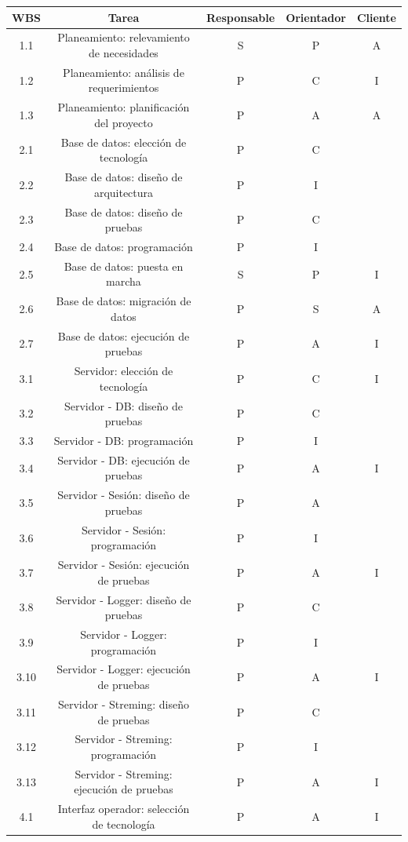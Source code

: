 \documentclass[
12pt,
spanish,
singlespacing,
parskip,
headsepline,]{article}
\begin{document}
\begin{table}[H]
	\centering
	\begin{tabular}{ccccc}
		WBS & Tarea & Responsable & Orientador & Cliente \\ \hline
		1.1 & Planeamiento: relevamiento de necesidades & S & P & A \\
		1.2 & Planeamiento: análisis de requerimientos & P & C &  I \\
		1.3 & Planeamiento: planificación del proyecto & P & A & A \\ \hline
		2.1 & Base de datos: elección de tecnología & P & C &   \\
		2.2 & Base de datos: diseño de arquitectura & P & I &   \\
		2.3 & Base de datos: diseño de pruebas & P & C &   \\
		2.4 & Base de datos: programación & P & I &   \\
		2.5 & Base de datos: puesta en marcha & S & P & I \\
		2.6 & Base de datos: migración de datos & P & S & A \\
		2.7 & Base de datos: ejecución de pruebas & P & A & I \\ \hline
		3.1 & Servidor: elección de tecnología & P & C & I \\
		3.2 & Servidor - DB: diseño de pruebas & P & C &   \\
		3.3 & Servidor - DB: programación  & P & I &   \\
		3.4 & Servidor - DB: ejecución de pruebas & P & A & I \\
		3.5 & Servidor - Sesión: diseño de pruebas & P & A &   \\
		3.6 & Servidor - Sesión: programación & P & I &   \\
		3.7 & Servidor - Sesión: ejecución de pruebas & P & A & I \\
		3.8 & Servidor - Logger: diseño de pruebas & P & C &   \\
		3.9 & Servidor - Logger: programación & P & I &   \\
		3.10 & Servidor - Logger: ejecución de pruebas & P & A & I \\
		3.11 & Servidor - Streming: diseño de pruebas & P & C &  \\
		3.12 & Servidor - Streming: programación & P & I &  \\
		3.13 & Servidor - Streming: ejecución de pruebas & P & A & I \\ \hline
		4.1 & Interfaz operador: selección de tecnología & P & A & I \\

\end{tabular}
\end{table}
\end{document}
